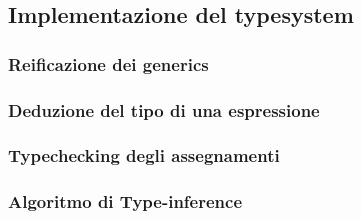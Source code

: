 \subsection{Implementazione del typesystem}

\subsubsection{Reificazione dei generics}
\subsubsection{Deduzione del tipo di una espressione}
\subsubsection{Typechecking degli assegnamenti}
\subsubsection{Algoritmo di Type-inference}